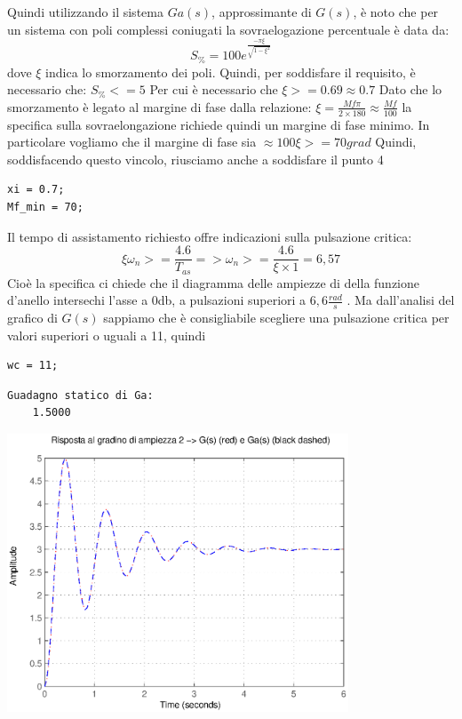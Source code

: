 \documentclass{article}
\begin{document}
\begin{par}

Quindi utilizzando il sistema $ Ga(s) $, approssimante di $ G(s) $, è noto che per un sistema
con poli complessi coniugati la sovraelogazione percentuale è data da:
$$ S_{\%} = 100e^{\frac{-\pi \xi}{\sqrt{1 - \xi^2}}} $$
dove $ \xi $ indica lo smorzamento dei poli.
Quindi, per soddisfare il requisito, è necessario che: $ S_{\%} <= 5 $
Per cui è necessario che $ \xi >= 0.69 \approx 0.7 $
Dato che lo smorzamento è legato al margine di fase dalla relazione:
$ \xi = \frac{Mf \pi}{2 \times 180} \approx \frac{Mf}{100} $ la specifica sulla sovraelongazione richiede quindi un
margine di fase minimo.
In particolare vogliamo che il margine di fase sia $ \approx 100 \xi >= 70 grad $
Quindi, soddisfacendo questo vincolo, riusciamo anche a soddisfare il punto 4
\end{par}

\begin{verbatim}
xi = 0.7;
Mf_min = 70;
\end{verbatim}

\begin{par}
Il tempo di assistamento richiesto offre indicazioni sulla pulsazione critica:
$$ \xi \omega_n >= \frac{4.6}{T_{as}} => \omega_n >= \frac{4.6}{\xi \times 1} = 6,57 $$
Cioè la specifica ci chiede che il diagramma delle ampiezze di della
funzione d'anello intersechi l'asse a 0db, a pulsazioni superiori a $ 6,6 \frac{rad}{s} $ .
Ma dall'analisi del grafico di $ G(s) $  sappiamo che è consigliabile
scegliere una pulsazione critica per valori superiori o uguali a 11,
quindi
\end{par}
\begin{verbatim}
wc = 11;
\end{verbatim}

        \color{lightgray} \begin{verbatim}Guadagno statico di Ga: 
    1.5000

\end{verbatim} \color{black}
    
\includegraphics [width=4in]{prog6RADICI_03.eps}
\end{document}
